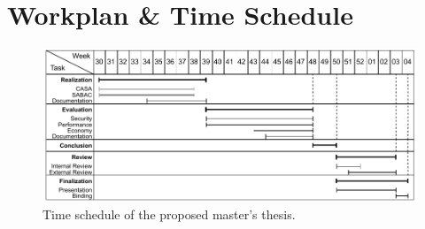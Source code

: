\chapter{Workplan \& Time Schedule}
\label{ch:schedule}
\begin{figure}
    \centering
    \includegraphics[width=1.0\linewidth]{figures/timeplan.drawio.pdf}
    \caption{Time schedule of the proposed master's thesis.}
    \label{fig:timeplan}
\end{figure}
